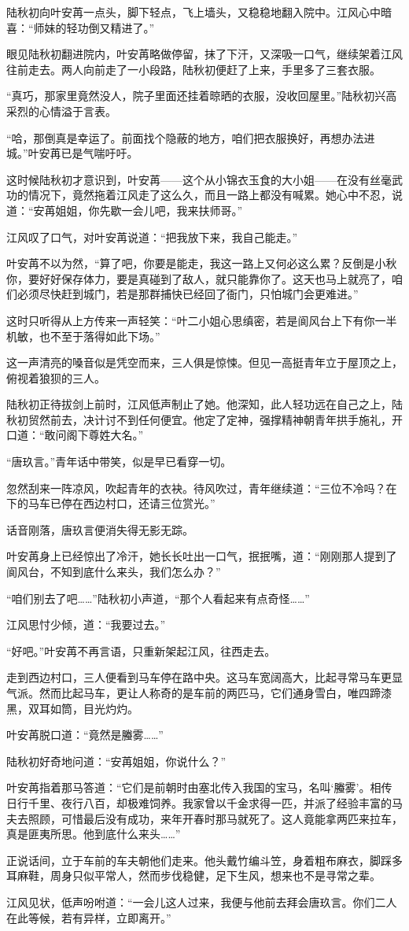 陆秋初向叶安苒一点头，脚下轻点，飞上墙头，又稳稳地翻入院中。江风心中暗喜：“师妹的轻功倒又精进了。”

眼见陆秋初翻进院内，叶安苒略做停留，抹了下汗，又深吸一口气，继续架着江风往前走去。两人向前走了一小段路，陆秋初便赶了上来，手里多了三套衣服。

“真巧，那家里竟然没人，院子里面还挂着晾晒的衣服，没收回屋里。”陆秋初兴高采烈的心情溢于言表。

“哈，那倒真是幸运了。前面找个隐蔽的地方，咱们把衣服换好，再想办法进城。”叶安苒已是气喘吁吁。

这时候陆秋初才意识到，叶安苒——这个从小锦衣玉食的大小姐——在没有丝毫武功的情况下，竟然拖着江风走了这么久，而且一路上都没有喊累。她心中不忍，说道：“安苒姐姐，你先歇一会儿吧，我来扶师哥。”

江风叹了口气，对叶安苒说道：“把我放下来，我自己能走。”

叶安苒不以为然，“算了吧，你要是能走，我这一路上又何必这么累？反倒是小秋你，要好好保存体力，要是真碰到了敌人，就只能靠你了。这天也马上就亮了，咱们必须尽快赶到城门，若是那群捕快已经回了衙门，只怕城门会更难进。”

这时只听得从上方传来一声轻笑：“叶二小姐心思缜密，若是阆风台上下有你一半机敏，也不至于落得如此下场。”

这一声清亮的嗓音似是凭空而来，三人俱是惊悚。但见一高挺青年立于屋顶之上，俯视着狼狈的三人。

陆秋初正待拔剑上前时，江风低声制止了她。他深知，此人轻功远在自己之上，陆秋初贸然前去，决计讨不到任何便宜。他定了定神，强撑精神朝青年拱手施礼，开口道：“敢问阁下尊姓大名。”

“唐玖言。”青年话中带笑，似是早已看穿一切。

忽然刮来一阵凉风，吹起青年的衣袂。待风吹过，青年继续道：“三位不冷吗？在下的马车已停在西边村口，还请三位赏光。”

话音刚落，唐玖言便消失得无影无踪。

叶安苒身上已经惊出了冷汗，她长长吐出一口气，抿抿嘴，道：“刚刚那人提到了阆风台，不知到底什么来头，我们怎么办？”

“咱们别去了吧……”陆秋初小声道，“那个人看起来有点奇怪……”

江风思忖少倾，道：“我要过去。”

“好吧。”叶安苒不再言语，只重新架起江风，往西走去。

走到西边村口，三人便看到马车停在路中央。这马车宽阔高大，比起寻常马车更显气派。然而比起马车，更让人称奇的是车前的两匹马，它们通身雪白，唯四蹄漆黑，双耳如筒，目光灼灼。

叶安苒脱口道：“竟然是螣雾……”

陆秋初好奇地问道：“安苒姐姐，你说什么？”

叶安苒指着那马答道：“它们是前朝时由塞北传入我国的宝马，名叫‘螣雾’。相传日行千里、夜行八百，却极难饲养。我家曾以千金求得一匹，并派了经验丰富的马夫去照顾，可惜最后没有成功，来年开春时那马就死了。这人竟能拿两匹来拉车，真是匪夷所思。他到底什么来头……”

正说话间，立于车前的车夫朝他们走来。他头戴竹编斗笠，身着粗布麻衣，脚踩多耳麻鞋，周身只似平常人，然而步伐稳健，足下生风，想来也不是寻常之辈。

江风见状，低声吩咐道：“一会儿这人过来，我便与他前去拜会唐玖言。你们二人在此等候，若有异样，立即离开。”